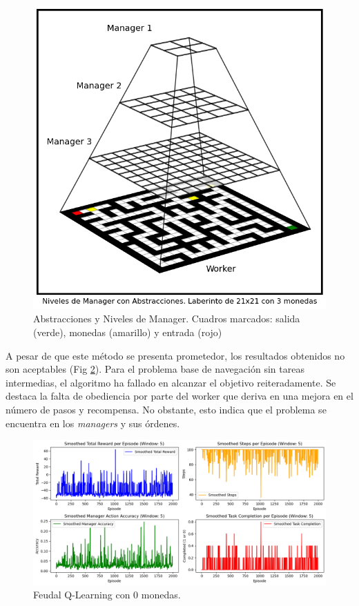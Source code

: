 \documentclass[letterpaper]{article} %
\begin{document}
\begin{figure}[H]
    \centering
    \includegraphics[width=0.7\columnwidth]{abstractions.png}
    \caption{Abstracciones y Niveles de Manager. Cuadros marcados: salida (verde), monedas (amarillo) y entrada (rojo) \label{fig:feudal-abstract}}
\end{figure}

A pesar de que este método se presenta prometedor, los resultados obtenidos no son aceptables (Fig \ref{fig:q-orig-results}). Para el 
problema base de navegación sin tareas intermedias, el algoritmo ha fallado en alcanzar el objetivo reiteradamente. Se destaca la falta
de obediencia por parte del worker que deriva en una mejora en el número de pasos y recompensa. No obstante, esto indica que el problema 
se encuentra en los \textit{managers} y sus órdenes. 

\begin{figure}[H]
    \centering
    \includegraphics[width=0.9\columnwidth]{q-original-results.png}
    \caption{Feudal Q-Learning con 0 monedas.\label{fig:q-orig-results}}
\end{figure}
\end{document}
